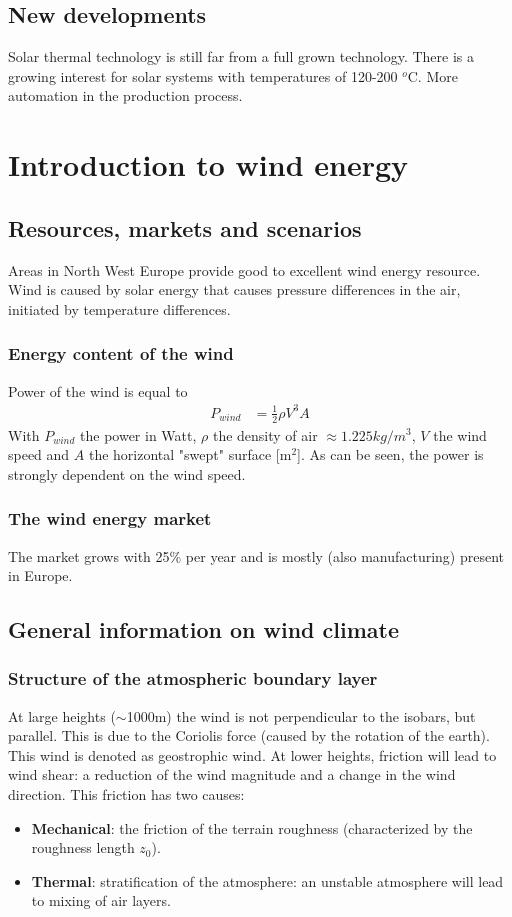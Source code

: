 \documentclass[a4paper,10pt]{article}
\begin{document}
\subsection{New developments}
Solar thermal technology is still far from a full grown technology. There is a growing interest for solar systems with temperatures of 120-200 $^o$C. More automation in the production process.


\section{Introduction to wind energy}
\subsection{Resources, markets and scenarios}
Areas in North West Europe provide good to excellent wind energy resource. Wind is caused by solar energy that causes pressure differences in the air, initiated by temperature differences.

\subsubsection{Energy content of the wind}
Power of the wind is equal to
\begin{align}
 P_{wind} &= \frac{1}{2} \rho V^3 A
\end{align}
With $P_{wind}$ the power in Watt, $\rho$ the density of air $\approx 1.225 kg/m^3$, $V$ the wind speed and $A$ the horizontal "swept" surface [m$^2$]. As can be seen, the power is strongly dependent on the wind speed. 

\subsubsection{The wind energy market}
The market grows with 25\% per year and is mostly (also manufacturing) present in Europe. 

\subsection{General information on wind climate}
\subsubsection{Structure of the atmospheric boundary layer}
At large heights ($\sim$1000m) the wind is not perpendicular to the isobars, but parallel. This is due to the Coriolis force (caused by the rotation of the earth). This wind is denoted as geostrophic wind. At lower heights, friction will lead to wind shear: a reduction of the wind magnitude and a change in the wind direction. This friction has two causes:
\begin{itemize}
 \item \textbf{Mechanical}: the friction of the terrain roughness (characterized by the roughness length $z_0$).
 \item \textbf{Thermal}: stratification of the atmosphere: an unstable atmosphere will lead to mixing of air layers.
\end{itemize}
\end{document}
